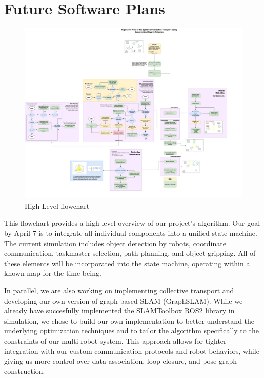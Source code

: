 \chapter{Future Software Plans}
\begin{figure}[H]
    \centering
    \includegraphics[width=1\linewidth, angle=-90]{final_progress_report_2/assets/images/future_software_plans/Flow7AprilCompromise.drawio (1).png}
    \caption{High Level flowchart}
    \label{fig:gantt_chart}
\end{figure}

\newpage
This flowchart provides a high-level overview of our project’s algorithm. Our goal by April 7 is to integrate all individual components into a unified state machine. The current simulation includes object detection by robots, coordinate communication, taskmaster selection, path planning, and object gripping. All of these elements will be incorporated into the state machine, operating within a known map for the time being.


\vspace{\baselineskip}
In parallel, we are also working on implementing collective transport and developing our own version of graph-based SLAM (GraphSLAM). While we already have succesfully implemented the SLAMToolbox ROS2 library in simulation, we chose to build our own implementation to better understand the underlying optimization techniques and to tailor the algorithm specifically to the constraints of our multi-robot system. This approach allows for tighter integration with our custom communication protocols and robot behaviors, while giving us more control over data association, loop closure, and pose graph construction.